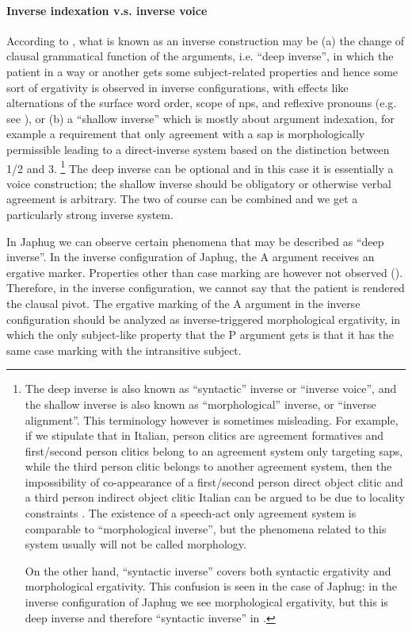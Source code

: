 \documentclass[a4paper, oneside, 12pt]{report}
\begin{document}
\paragraph*{Inverse indexation v.s. inverse voice}
According to \citet{oxford2023tale},
what is known as an inverse construction may be 
(a) the change of clausal grammatical function of the arguments,
i.e. ``deep inverse'', in which the patient in a way or another gets some subject-related properties 
and hence some sort of ergativity is observed in inverse configurations,
with effects like alternations of the surface word order,
scope of \ac{np}s, and reflexive pronouns (e.g. see \citealt{bruening2005algonquian}), or
(b) a ``shallow inverse'' which is mostly about argument indexation, 
for example a requirement that only agreement with a \ac{sap} 
is morphologically permissible
leading to a direct-inverse system based on the distinction between 1/2 and 3.%
\footnote{
    The deep inverse is also known as ``syntactic'' inverse or ``inverse voice'',
    and the shallow inverse is also known as ``morphological'' inverse, or ``inverse alignment''.
    This terminology however is sometimes misleading.
    For example, if we stipulate that in Italian,
    person clitics are agreement formatives
    and first/second person clitics belong to an agreement system only targeting \ac{sap}s,
    while the third person clitic belongs to another agreement system,
    then the impossibility of co-appearance of a first/second person direct object clitic 
    and a third person indirect object clitic Italian 
    can be argued to be due to locality constraints
    \citep{bianchi2006syntax}.
    The existence of a speech-act only agreement system is comparable to ``morphological inverse'',
    but the phenomena related to this system usually will not be called morphology.

    On the other hand, ``syntactic inverse'' covers both syntactic ergativity and morphological ergativity.
    This confusion is seen in the case of Japhug:
    in the inverse configuration of Japhug we see morphological ergativity,
    but this is deep inverse and therefore ``syntactic inverse'' in \citet{oxford2023tale}.
}
The deep inverse can be optional and in this case it is essentially a voice construction;
the shallow inverse should be obligatory or otherwise verbal agreement is arbitrary.
The two of course can be combined and we get a particularly strong inverse system.

In Japhug we can observe certain phenomena that may be described as ``deep inverse''.
In the inverse configuration of Japhug, 
the A argument receives an ergative marker.
Properties other than case marking are however not observed
().
Therefore, in the inverse configuration, we cannot say that
the patient is rendered the clausal pivot.
The ergative marking of the A argument in the inverse configuration should be analyzed as
inverse-triggered morphological ergativity,
in which the only subject-like property that the P argument gets
is that it has the same case marking with the intransitive subject. 
\end{document}
